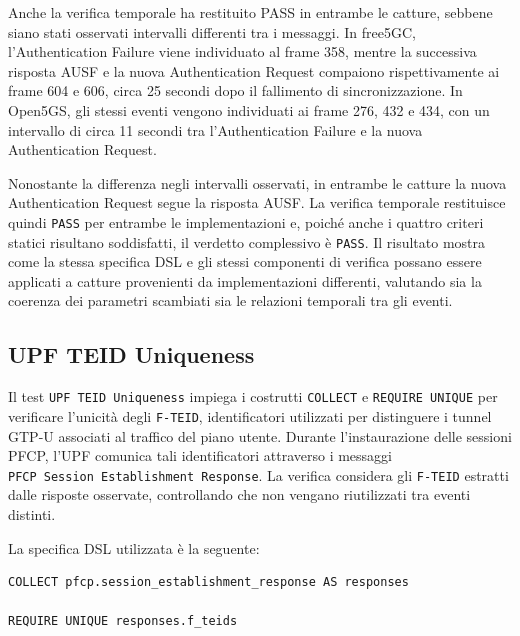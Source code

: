 Anche la verifica temporale ha restituito PASS in entrambe le catture, sebbene siano stati osservati intervalli differenti tra i messaggi. In free5GC, l'Authentication Failure viene individuato al frame 358, mentre la successiva risposta AUSF e la nuova Authentication Request compaiono rispettivamente ai frame 604 e 606, circa 25 secondi dopo il fallimento di sincronizzazione. In Open5GS, gli stessi eventi vengono individuati ai frame 276, 432 e 434, con un intervallo di circa 11 secondi tra l'Authentication Failure e la nuova Authentication Request.

Nonostante la differenza negli intervalli osservati, in entrambe le catture la nuova Authentication Request segue la risposta AUSF. La verifica temporale restituisce quindi \texttt{PASS} per entrambe le implementazioni e, poiché anche i quattro criteri statici risultano soddisfatti, il verdetto complessivo è \texttt{PASS}. Il risultato mostra come la stessa specifica DSL e gli stessi componenti di verifica possano essere applicati a catture provenienti da implementazioni differenti, valutando sia la coerenza dei parametri scambiati sia le relazioni temporali tra gli eventi.

\subsection{UPF TEID Uniqueness}\label{upf-teid-uniqueness}

Il test \texttt{UPF\ TEID\ Uniqueness} impiega i costrutti \texttt{COLLECT} e \texttt{REQUIRE\ UNIQUE} per verificare l'unicità degli \texttt{F-TEID}, identificatori utilizzati per distinguere i tunnel GTP-U associati al traffico del piano utente. Durante l'instaurazione delle sessioni PFCP, l'UPF comunica tali identificatori attraverso i messaggi \texttt{PFCP\ Session\ Establishment\ Response}. La verifica considera gli \texttt{F-TEID} estratti dalle risposte osservate, controllando che non vengano riutilizzati tra eventi distinti.

La specifica DSL utilizzata è la seguente:

\par\noindent\begin{minipage}{\linewidth}
\begin{lstlisting}
COLLECT pfcp.session_establishment_response AS responses

REQUIRE UNIQUE responses.f_teids
\end{lstlisting}
\end{minipage}\par

